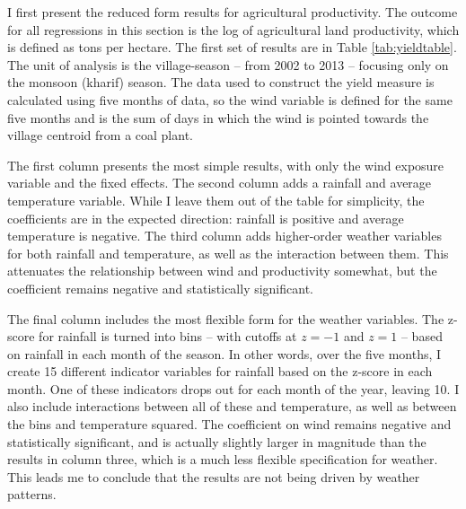 \documentclass[
]{article}
\begin{document}
\label{results}

I first present the reduced form results for agricultural productivity. The outcome for all regressions in this section is the log of agricultural land productivity, which is defined as tons per hectare. The first set of results are in Table \ref{tab:yieldtable}. The unit of analysis is the village-season -- from 2002 to 2013 -- focusing only on the monsoon (kharif) season. The data used to construct the yield measure is calculated using five months of data, so the wind variable is defined for the same five months and is the sum of days in which the wind is pointed towards the village centroid from a coal plant.

The first column presents the most simple results, with only the wind exposure variable and the fixed effects. The second column adds a rainfall and average temperature variable. While I leave them out of the table for simplicity, the coefficients are in the expected direction: rainfall is positive and average temperature is negative. The third column adds higher-order weather variables for both rainfall and temperature, as well as the interaction between them. This attenuates the relationship between wind and productivity somewhat, but the coefficient remains negative and statistically significant.

The final column includes the most flexible form for the weather variables. The z-score for rainfall is turned into bins -- with cutoffs at \(z=-1\) and \(z=1\) -- based on rainfall in each month of the season. In other words, over the five months, I create 15 different indicator variables for rainfall based on the z-score in each month. One of these indicators drops out for each month of the year, leaving 10. I also include interactions between all of these and temperature, as well as between the bins and temperature squared. The coefficient on wind remains negative and statistically significant, and is actually slightly larger in magnitude than the results in column three, which is a much less flexible specification for weather. This leads me to conclude that the results are not being driven by weather patterns.
\end{document}
